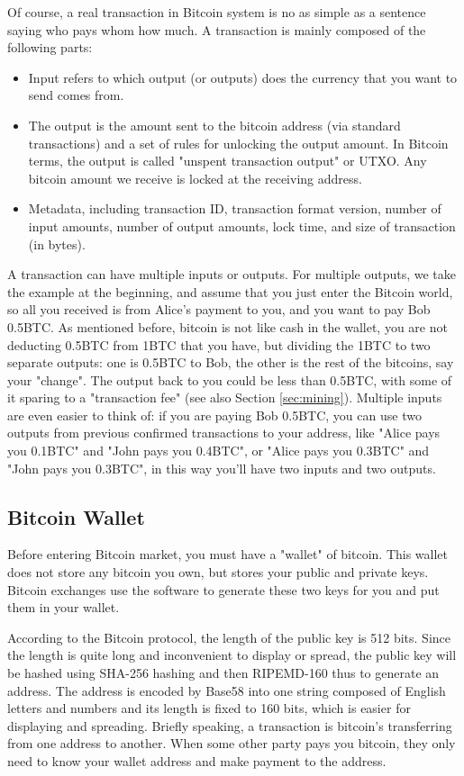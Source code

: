 \documentclass[12pt,a4paper]{article}
\begin{document}
Of course, a real transaction in Bitcoin system is no as simple as a sentence saying who pays whom how much. A transaction is mainly composed of the following parts:
\begin{itemize}
	\item Input refers to which output (or outputs) does the currency that you want to send comes from.
	\item The output is the amount sent to the bitcoin address (via standard transactions) and a set of rules for unlocking the output amount. In Bitcoin terms, the output is called "unspent transaction output" or UTXO. Any bitcoin amount we receive is locked at the receiving address.
	\item Metadata, including transaction ID, transaction format version, number of input amounts, number of output amounts, lock time, and size of transaction (in bytes).
\end{itemize}

A transaction can have multiple inputs or outputs. For multiple outputs, we take the example at the beginning, and assume that you just enter the Bitcoin world, so all you received is from Alice's payment to you, and you want to pay Bob 0.5BTC. As mentioned before, bitcoin is not like cash in the wallet, you are not deducting 0.5BTC from 1BTC that you have, but dividing the 1BTC to two separate outputs: one is 0.5BTC to Bob, the other is the rest of the bitcoins, say your "change". The output back to you could be less than 0.5BTC, with some of it sparing to a "transaction fee" (see also Section \ref{sec:mining}). Multiple inputs are even easier to think of: if you are paying Bob 0.5BTC, you can use two outputs from previous confirmed transactions to your address, like "Alice pays you 0.1BTC" and "John pays you 0.4BTC", or "Alice pays you 0.3BTC" and "John pays you 0.3BTC", in this way you'll have two inputs and two outputs.

\subsection{Bitcoin Wallet}
Before entering Bitcoin market, you must have a "wallet" of bitcoin. This wallet does not store any bitcoin you own, but stores your public and private keys. 
Bitcoin exchanges use the software to generate these two keys for you and put them in your wallet.

According to the Bitcoin protocol, the length of the public key is 512 bits. Since the length is quite long and inconvenient to display or spread, the public key will be hashed using SHA-256 hashing and then RIPEMD-160 thus to generate an address. The address is encoded by Base58 into one string composed of English letters and numbers and its length is fixed to 160 bits, which is easier for displaying and spreading. Briefly speaking, a transaction is bitcoin's transferring from one address to another. When some other party pays you bitcoin, they only need to know your wallet address and make payment to the address. 
\end{document}
